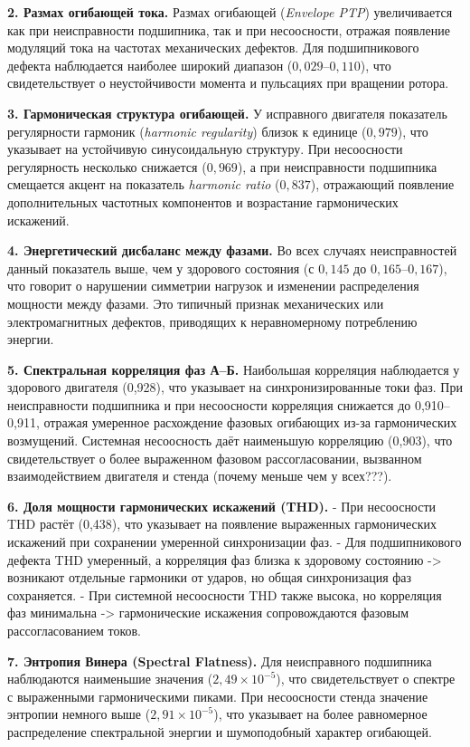 \textbf{2. Размах огибающей тока.}
Размах огибающей (\textit{Envelope PTP}) увеличивается как при неисправности подшипника, так и при несоосности, отражая появление модуляций тока на частотах механических дефектов. 
Для подшипникового дефекта наблюдается наиболее широкий диапазон ($0{,}029$–$0{,}110$), что свидетельствует о неустойчивости момента и пульсациях при вращении ротора.

\textbf{3. Гармоническая структура огибающей.}
У исправного двигателя показатель регулярности гармоник (\textit{harmonic regularity}) близок к единице ($0{,}979$), что указывает на устойчивую синусоидальную структуру. 
При несоосности регулярность несколько снижается ($0{,}969$), а при неисправности подшипника смещается акцент на показатель \textit{harmonic ratio} ($0{,}837$), отражающий появление дополнительных частотных компонентов и возрастание гармонических искажений.

\textbf{4. Энергетический дисбаланс между фазами.}
Во всех случаях неисправностей данный показатель выше, чем у здорового состояния (с $0{,}145$ до $0{,}165$–$0{,}167$), что говорит о нарушении симметрии нагрузок и изменении распределения мощности между фазами. 
Это типичный признак механических или электромагнитных дефектов, приводящих к неравномерному потреблению энергии.

\textbf{5. Спектральная корреляция фаз А–Б.}
Наибольшая корреляция наблюдается у здорового двигателя (0,928), что указывает на синхронизированные токи фаз. 
При неисправности подшипника и при несоосности корреляция снижается до 0,910–0,911, отражая умеренное расхождение фазовых огибающих из-за гармонических возмущений. 
Системная несоосность даёт наименьшую корреляцию (0,903), что свидетельствует о более выраженном фазовом рассогласовании, вызванном взаимодействием двигателя и стенда (почему меньше чем у всех???).

\textbf{6. Доля мощности гармонических искажений (THD).}
- При несоосности THD растёт (0,438), что указывает на появление выраженных гармонических искажений при сохранении умеренной синхронизации фаз.  
- Для подшипникового дефекта THD умеренный, а корреляция фаз близка к здоровому состоянию -> возникают отдельные гармоники от ударов, но общая синхронизация фаз сохраняется.  
- При системной несоосности THD также высока, но корреляция фаз минимальна -> гармонические искажения сопровождаются фазовым рассогласованием токов.

\textbf{7. Энтропия Винера (Spectral Flatness).}
Для неисправного подшипника наблюдаются наименьшие значения ($2{,}49\times10^{-5}$), что свидетельствует о спектре с выраженными гармоническими пиками. 
При несоосности стенда значение энтропии немного выше ($2{,}91\times10^{-5}$), что указывает на более равномерное распределение спектральной энергии и шумоподобный характер огибающей.

